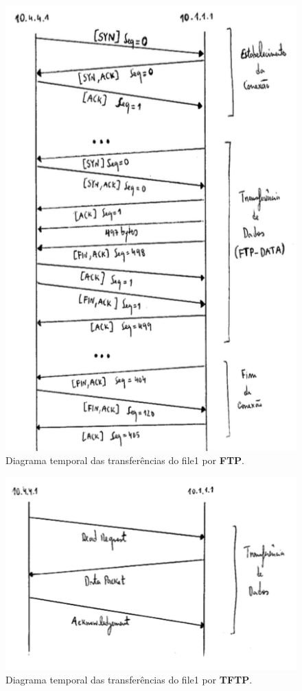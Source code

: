 \documentclass{llncs}
\begin{document}
\begin{figure}[H]
\begin{center}
\includegraphics[scale=0.45]{2_ftp.png}
\end{center}
\caption{\label{fig:ssh}Diagrama temporal das transferências do file1 por \textbf{FTP}.}
\end{figure}

\begin{figure}[H]
\begin{center}
\includegraphics[scale=0.45]{2_tftp.png}
\end{center}
\caption{\label{fig:ssh}Diagrama temporal das transferências do file1 por \textbf{TFTP}.}
\end{figure}
\end{document}
